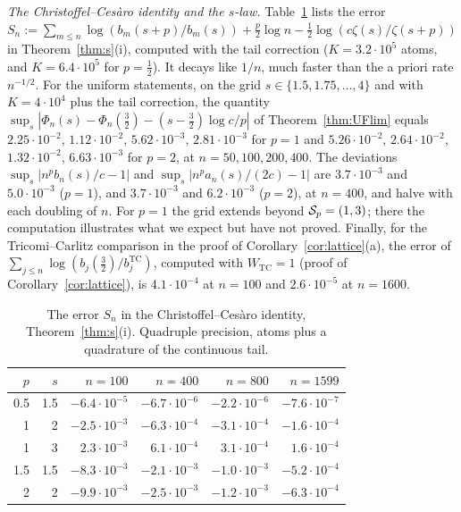 \emph{The Christoffel--Ces\`aro identity and the $s$-law.} Table~\ref{tab:shift} lists the error
$S_n:=\sum_{m\le n}\log(b_m(s+p)/b_m(s))+\frac p2\log n-\frac12\log(c\zeta(s)/\zeta(s+p))$ in Theorem~\ref{thm:s}(i),
computed with the tail correction ($K=3.2\cdot10^5$ atoms, and $K=6.4\cdot10^5$ for $p=\frac12$). It decays like $1/n$, much faster than the
a priori rate $n^{-1/2}$. For the uniform statements, on the grid $s\in\{1.5,1.75,\dots,4\}$ and with $K=4\cdot10^4$ plus the
tail correction, the quantity $\sup_s|\Phi_n(s)-\Phi_n(\frac32)-(s-\frac32)\log c/p|$ of Theorem~\ref{thm:UFlim} equals
$2.25\cdot10^{-2}$, $1.12\cdot10^{-2}$, $5.62\cdot10^{-3}$, $2.81\cdot10^{-3}$ for $p=1$ and $5.26\cdot10^{-2}$,
$2.64\cdot10^{-2}$, $1.32\cdot10^{-2}$, $6.63\cdot10^{-3}$ for $p=2$, at $n=50,100,200,400$. The deviations
$\sup_s|n^pb_n(s)/c-1|$ and $\sup_s|n^pa_n(s)/(2c)-1|$ are $3.7\cdot10^{-3}$ and $5.0\cdot10^{-3}$ ($p=1$), and
$3.7\cdot10^{-3}$ and $6.2\cdot10^{-3}$ ($p=2$), at $n=400$, and halve with each doubling of $n$. For $p=1$ the grid extends
beyond $\mathcal{S}_p=(1,3)$; there the computation illustrates what we expect but have not proved. Finally, for the
Tricomi--Carlitz comparison in the proof of Corollary~\ref{cor:lattice}(a), the error of
$\sum_{j\le n}\log(b_j(\frac32)/b^{\mathrm{TC}}_j)$, computed with $W_{\mathrm{TC}}=1$ (proof of Corollary~\ref{cor:lattice}),
is $4.1\cdot10^{-4}$ at $n=100$ and $2.6\cdot10^{-5}$ at $n=1600$.

\begin{table}[ht]
\centering
\small
\begin{tabular}{rrrrrr}
\toprule
$p$ & $s$ & $n=100$ & $n=400$ & $n=800$ & $n=1599$\\
\midrule
0.5 & 1.5 & $-6.4\cdot10^{-5}$ & $-6.7\cdot10^{-6}$ & $-2.2\cdot10^{-6}$ & $-7.6\cdot10^{-7}$\\
1   & 2   & $-2.5\cdot10^{-3}$ & $-6.3\cdot10^{-4}$ & $-3.1\cdot10^{-4}$ & $-1.6\cdot10^{-4}$\\
1   & 3   & $2.3\cdot10^{-3}$  & $6.1\cdot10^{-4}$  & $3.1\cdot10^{-4}$  & $1.6\cdot10^{-4}$\\
1.5 & 1.5 & $-8.3\cdot10^{-3}$ & $-2.1\cdot10^{-3}$ & $-1.0\cdot10^{-3}$ & $-5.2\cdot10^{-4}$\\
2   & 2   & $-9.9\cdot10^{-3}$ & $-2.5\cdot10^{-3}$ & $-1.2\cdot10^{-3}$ & $-6.3\cdot10^{-4}$\\
\bottomrule
\end{tabular}
\caption{The error $S_n$ in the Christoffel--Ces\`aro identity, Theorem~\ref{thm:s}(i). Quadruple precision, atoms
plus a quadrature of the continuous tail.}
\label{tab:shift}
\end{table}

